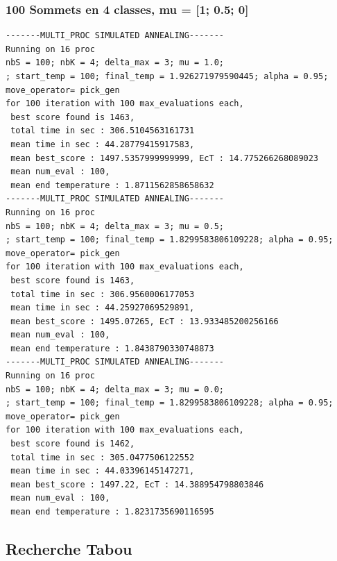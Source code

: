 \documentclass[a4paper]{article}
\begin{document}
\subsubsection{100 Sommets en 4 classes, mu = [1; 0.5; 0]}
\begin{verbatim}
-------MULTI_PROC SIMULATED ANNEALING-------
Running on 16 proc
nbS = 100; nbK = 4; delta_max = 3; mu = 1.0;
; start_temp = 100; final_temp = 1.926271979590445; alpha = 0.95; move_operator= pick_gen
for 100 iteration with 100 max_evaluations each, 
 best score found is 1463,
 total time in sec : 306.5104563161731
 mean time in sec : 44.28779415917583,
 mean best_score : 1497.5357999999999, EcT : 14.775266268089023
 mean num_eval : 100,
 mean end temperature : 1.8711562858658632
-------MULTI_PROC SIMULATED ANNEALING-------
Running on 16 proc
nbS = 100; nbK = 4; delta_max = 3; mu = 0.5;
; start_temp = 100; final_temp = 1.8299583806109228; alpha = 0.95; move_operator= pick_gen
for 100 iteration with 100 max_evaluations each, 
 best score found is 1463,
 total time in sec : 306.9560006177053
 mean time in sec : 44.25927069529891,
 mean best_score : 1495.07265, EcT : 13.933485200256166
 mean num_eval : 100,
 mean end temperature : 1.8438790330748873
-------MULTI_PROC SIMULATED ANNEALING-------
Running on 16 proc
nbS = 100; nbK = 4; delta_max = 3; mu = 0.0;
; start_temp = 100; final_temp = 1.8299583806109228; alpha = 0.95; move_operator= pick_gen
for 100 iteration with 100 max_evaluations each, 
 best score found is 1462,
 total time in sec : 305.0477506122552
 mean time in sec : 44.03396145147271,
 mean best_score : 1497.22, EcT : 14.388954798803846
 mean num_eval : 100,
 mean end temperature : 1.8231735690116595
\end{verbatim}

\subsection{Recherche Tabou}
\end{document}
